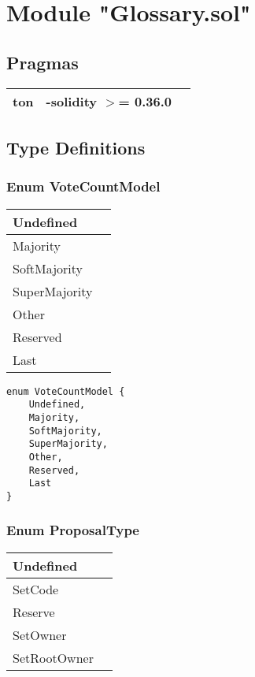 
\section{Module "Glossary.sol"}


\subsection{Pragmas}


\noindent\begin{tabular}{|l|l|p{5cm}|}\hline
ton & -solidity $>$= 0.36.0 &\\\hline
\end{tabular}


\subsection{Type Definitions}


\subsubsection{Enum VoteCountModel}


\ifsoltables
\noindent\begin{tabular}{|l|p{6cm}|}\hline
Undefined & \\\hline
Majority & \\\hline
SoftMajority & \\\hline
SuperMajority & \\\hline
Other & \\\hline
Reserved & \\\hline
Last & \\\hline
\end{tabular}
\fi


\begin{lstlisting}[firstnumber=3]
enum VoteCountModel {
    Undefined,
    Majority,
    SoftMajority,
    SuperMajority,
    Other,
    Reserved,
    Last
}
\end{lstlisting}

\subsubsection{Enum ProposalType}


\ifsoltables
\noindent\begin{tabular}{|l|p{6cm}|}\hline
Undefined & \\\hline
SetCode & \\\hline
Reserve & \\\hline
SetOwner & \\\hline
SetRootOwner & \\\hline
\end{tabular}
\fi


